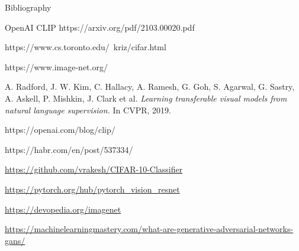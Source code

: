 \documentclass[t]{beamer}
\begin{document}
\begin{frame}{Bibliography}
\begin{thebibliography}{a,b,c}
 OpenAI CLIP https://arxiv.org/pdf/2103.00020.pdf

 https://www.cs.toronto.edu/~kriz/cifar.html

 https://www.image-net.org/

 A. Radford, J. W. Kim, C. Hallacy, A. Ramesh, G. Goh, S. Agarwal, G. Sastry, A. Askell, P. Mishkin, J. Clark et al. {\it Learning transferable visual models
from natural language supervision.} In CVPR, 2019.

 https://openai.com/blog/clip/

 https://habr.com/en/post/537334/

 \url{https://github.com/vrakesh/CIFAR-10-Classifier}

 \url{https://pytorch.org/hub/pytorch_vision_resnet}

 \url{https://devopedia.org/imagenet}

 \url{https://machinelearningmastery.com/what-are-generative-adversarial-networks-gans/}

\end{thebibliography}
\end{frame}
\end{document}
